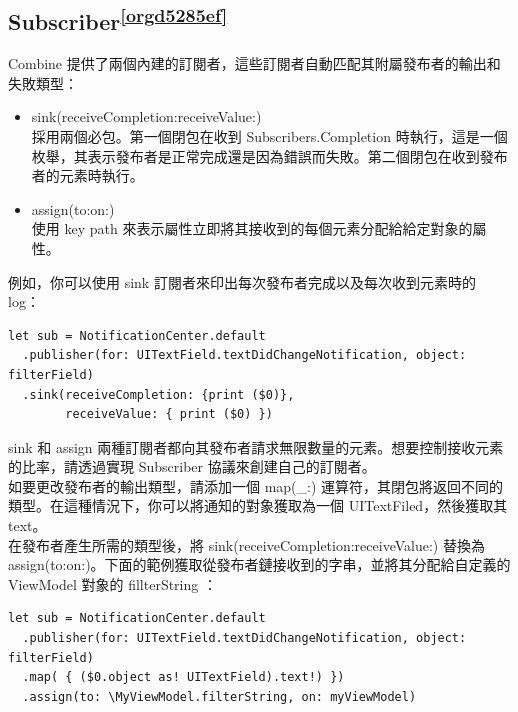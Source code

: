 \documentclass[a4paper,12pt]{article}
\begin{document}
\subsection{Subscriber\textsuperscript{\ref{orgd5285ef}}}
\label{sec:org2267d06}
Combine 提供了兩個內建的訂閱者，這些訂閱者自動匹配其附屬發布者的輸出和失敗類型：\\
\begin{itemize}
\item sink(receiveCompletion:receiveValue:)\\
採用兩個必包。第一個閉包在收到 Subscribers.Completion 時執行，這是一個枚舉，其表示發布者是正常完成還是因為錯誤而失敗。第二個閉包在收到發布者的元素時執行。\\
\item assign(to:on:)\\
使用 key path 來表示屬性立即將其接收到的每個元素分配給給定對象的屬性。\\
\end{itemize}
例如，你可以使用 sink 訂閱者來印出每次發布者完成以及每次收到元素時的 log：\\
\lstset{breaklines=true,language=swift,label= ,caption= ,captionpos=b,firstnumber=1,numbers=left}
\begin{lstlisting}
let sub = NotificationCenter.default
  .publisher(for: UITextField.textDidChangeNotification, object: filterField)
  .sink(receiveCompletion: {print ($0)},
        receiveValue: { print ($0) })
\end{lstlisting}
sink 和 assign 兩種訂閱者都向其發布者請求無限數量的元素。想要控制接收元素的比率，請透過實現 Subscriber 協議來創建自己的訂閱者。\\
如要更改發布者的輸出類型，請添加一個 map(\_:) 運算符，其閉包將返回不同的類型。在這種情況下，你可以將通知的對象獲取為一個 UITextFiled，然後獲取其 text。\\
在發布者產生所需的類型後，將 sink(receiveCompletion:receiveValue:) 替換為 assign(to:on:)。下面的範例獲取從發布者鏈接收到的字串，並將其分配給自定義的 ViewModel 對象的 fillterString ：\\
\lstset{breaklines=true,language=swift,label= ,caption= ,captionpos=b,firstnumber=1,numbers=left}
\begin{lstlisting}
let sub = NotificationCenter.default
  .publisher(for: UITextField.textDidChangeNotification, object: filterField)
  .map( { ($0.object as! UITextField).text!) })
  .assign(to: \MyViewModel.filterString, on: myViewModel)
\end{lstlisting}
\end{document}
